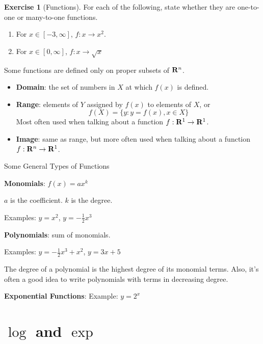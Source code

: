 \documentclass[]{book}
\providecommand{\tightlist}{%
  \setlength{\itemsep}{0pt}\setlength{\parskip}{0pt}}
\theoremstyle{definition}
\theoremstyle{definition}
\theoremstyle{definition}
\newtheorem{exercise}{Exercise}[chapter]
\theoremstyle{remark}
\begin{document}
\begin{exercise}[Functions]
\protect\hypertarget{exr:functions1}{}{\label{exr:functions1} {} }
For each of the following, state whether they are one-to-one or many-to-one functions.

\begin{enumerate}
\def\labelenumi{\arabic{enumi}.}
\item
  For \(x \in [-3, \infty]\), \(f: x \rightarrow x^2\).
\item
  For \(x \in [0, \infty]\), \(f: x \rightarrow \sqrt{x}\)
\end{enumerate}
\end{exercise}

Some functions are defined only on proper subsets of \({\bf R}^n\).

\begin{itemize}
\tightlist
\item
  \textbf{Domain}: the set of numbers in \(X\) at which \(f(x)\) is defined.
\item
  \textbf{Range}: elements of \(Y\) assigned by \(f(x)\) to elements of \(X\), or \[f(X)=\{ y : y=f(x), x\in X\}\]
  Most often used when talking about a function \(f:{\bf R}^1\to{\bf R}^1\).
\item
  \textbf{Image}: same as range, but more often used when talking about a function \(f:{\bf R}^n\to{\bf R}^1\).
\end{itemize}

Some General Types of Functions

\textbf{Monomials}: \(f(x)=a x^k\)

\(a\) is the coefficient. \(k\) is the degree.

Examples: \(y=x^2\), \(y=-\frac{1}{2}x^3\)

\textbf{Polynomials}: sum of monomials.

Examples: \(y=-\frac{1}{2}x^3+x^2\), \(y=3x+5\)

The degree of a polynomial is the highest degree of its monomial terms. Also, it's often a good idea to write polynomials with terms in decreasing degree.

\textbf{Exponential Functions}: Example: \(y=2^x\)

\hypertarget{logexponents}{%
\section{\texorpdfstring{\(\log\) and \(\exp\)}{\textbackslash{}log and \textbackslash{}exp}}\label{logexponents}}
\end{document}
